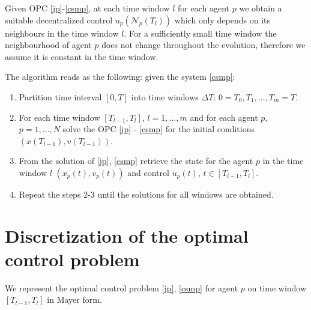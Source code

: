 \documentclass[a4paper, english]{article}
\begin{document}
 Given OPC \eqref{jp}-\eqref{csmp}, at each time window $l$ for each agent $p$ we obtain a suitable decentralized control $u_p(\mathcal{N}_p(T_l))$ which only depends on its neighbours in the time window $l$.
 For a sufficiently small time window the  neighbourhood of agent $p$ does not change throughout the evolution, therefore we assume it is constant in the time window.


   The algorithm reads as the following: given the system \eqref{csmp}:
   \begin{enumerate}
   \item Partition time interval $[0, T]$ into time windows $\Delta T$: $0 = T_0, T_1, \dots, T_m = T$.
   \item For each time window  $[T_{l-1}, T_{l}]$, $l = 1, \dots, m$ and for each agent $p$, $p = 1, \dots, N$  solve the OPC \eqref{jp} - \eqref{csmp} for the initial conditions $(x(T_{l-1}), v(T_{l-1}))$.
   \item From the solution of \eqref{jp}, \eqref{csmp}  retrieve the  state for the agent $p$ in the time window $l$ $(x_p(t), v_p(t))$ and control $u_p(t)$, $t\in [T_{l-1}, T_{l}]$.
   \item Repeat the steps 2-3 until the solutions for all windows are obtained.
 \end{enumerate}






































 \section{Discretization of the optimal control problem}
  We represent the optimal control problem  \eqref{jp}, \eqref{csmp} for agent $p$ on time window $[T_{l-1}, T_{l}]$ in Mayer form.
\end{document}
